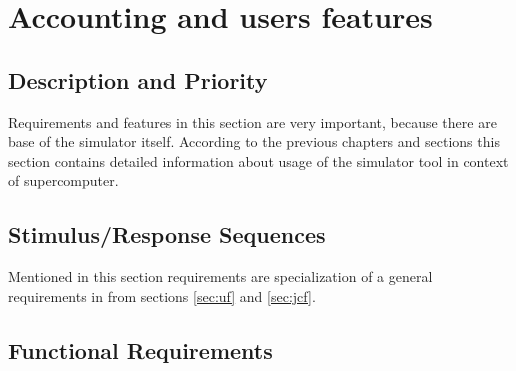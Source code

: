 \documentclass{report}
\begin{document}
\section{Accounting and users features}

\subsection{Description and Priority}
Requirements and features in this section are very important, because there are base of the simulator itself. According to the previous chapters and sections this section contains detailed information about usage of the simulator tool in context of supercomputer.
\subsection{Stimulus/Response Sequences}
Mentioned in this section requirements are specialization of a general requirements in from sections \ref{sec:uf} and \ref{sec:jcf}. 
\subsection{Functional Requirements}
\end{document}
